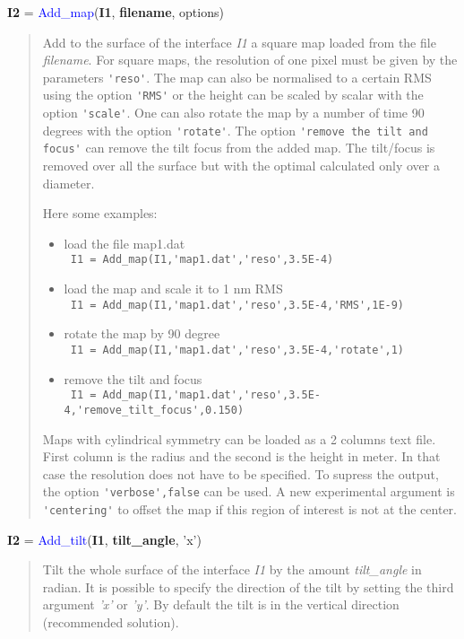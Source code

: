 \noindent \textbf{I2} = \textcolor{blue}{Add\_map}(\textbf{I1}, \textbf{filename}, options)
\vspace*{-0.2cm}
\begin{quote}
Add to the surface of the interface \textsl{I1} a square map loaded from the file \textsl{filename}. For square maps, the resolution of one pixel must be given by the parameters \verb?'reso'?. The map can also be normalised to a certain RMS using the option \verb?'RMS'? or the height can be scaled by scalar with the option \verb?'scale'?. One can also rotate the map by a number of time 90 degrees with the option \verb?'rotate'?. The option \verb?'remove the tilt and focus'? can remove the tilt focus from the added map. The tilt/focus is removed over all the surface but with the optimal calculated only over a diameter.

Here some examples:
\begin{itemize}
  \item load the file map1.dat \\
        \verb? I1 = Add_map(I1,'map1.dat','reso',3.5E-4) ?
  \item load the map and scale it to 1 nm RMS \\
        \verb? I1 = Add_map(I1,'map1.dat','reso',3.5E-4,'RMS',1E-9) ?
  \item rotate the map by 90 degree \\
        \verb? I1 = Add_map(I1,'map1.dat','reso',3.5E-4,'rotate',1) ?
  \item remove the tilt and focus \\
         \verb? I1 = Add_map(I1,'map1.dat','reso',3.5E-4,'remove_tilt_focus',0.150) ?
\end{itemize}

Maps with cylindrical symmetry can be loaded as a 2 columns text file. First column is the radius and the second is the height in meter. In that case the resolution does not have to be specified. To supress the output, the option \verb?'verbose',false? can be used. A new experimental argument is \verb?'centering'? to offset the map if this region of interest is not at the center.
\end{quote}


\noindent \textbf{I2} = \textcolor{blue}{Add\_tilt}(\textbf{I1}, \textbf{tilt\_angle}, 'x')
\vspace*{-0.2cm}
\begin{quote}
Tilt the whole surface of the interface \textsl{I1} by the amount \textsl{tilt\_angle} in radian. It is possible to specify the direction of the tilt by setting the third argument \textsl{'x'} or \textsl{'y'}. By default the tilt is in the vertical direction (recommended solution).
\end{quote}



